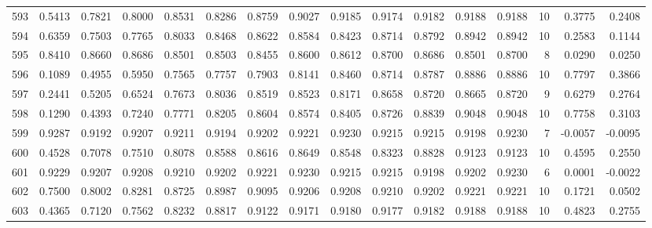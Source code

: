 \begin{tabular}{lrrrrrrrrrrrrrrr}
593 &      0.5413 &  0.7821 &  0.8000 &  0.8531 &  0.8286 &  0.8759 &  0.9027 &  0.9185 &  0.9174 &  0.9182 &   0.9188 &     0.9188 &     10 &                    0.3775 &                     0.2408 \\
594 &      0.6359 &  0.7503 &  0.7765 &  0.8033 &  0.8468 &  0.8622 &  0.8584 &  0.8423 &  0.8714 &  0.8792 &   0.8942 &     0.8942 &     10 &                    0.2583 &                     0.1144 \\
595 &      0.8410 &  0.8660 &  0.8686 &  0.8501 &  0.8503 &  0.8455 &  0.8600 &  0.8612 &  0.8700 &  0.8686 &   0.8501 &     0.8700 &      8 &                    0.0290 &                     0.0250 \\
596 &      0.1089 &  0.4955 &  0.5950 &  0.7565 &  0.7757 &  0.7903 &  0.8141 &  0.8460 &  0.8714 &  0.8787 &   0.8886 &     0.8886 &     10 &                    0.7797 &                     0.3866 \\
597 &      0.2441 &  0.5205 &  0.6524 &  0.7673 &  0.8036 &  0.8519 &  0.8523 &  0.8171 &  0.8658 &  0.8720 &   0.8665 &     0.8720 &      9 &                    0.6279 &                     0.2764 \\
598 &      0.1290 &  0.4393 &  0.7240 &  0.7771 &  0.8205 &  0.8604 &  0.8574 &  0.8405 &  0.8726 &  0.8839 &   0.9048 &     0.9048 &     10 &                    0.7758 &                     0.3103 \\
599 &      0.9287 &  0.9192 &  0.9207 &  0.9211 &  0.9194 &  0.9202 &  0.9221 &  0.9230 &  0.9215 &  0.9215 &   0.9198 &     0.9230 &      7 &                   -0.0057 &                    -0.0095 \\
600 &      0.4528 &  0.7078 &  0.7510 &  0.8078 &  0.8588 &  0.8616 &  0.8649 &  0.8548 &  0.8323 &  0.8828 &   0.9123 &     0.9123 &     10 &                    0.4595 &                     0.2550 \\
601 &      0.9229 &  0.9207 &  0.9208 &  0.9210 &  0.9202 &  0.9221 &  0.9230 &  0.9215 &  0.9215 &  0.9198 &   0.9202 &     0.9230 &      6 &                    0.0001 &                    -0.0022 \\
602 &      0.7500 &  0.8002 &  0.8281 &  0.8725 &  0.8987 &  0.9095 &  0.9206 &  0.9208 &  0.9210 &  0.9202 &   0.9221 &     0.9221 &     10 &                    0.1721 &                     0.0502 \\
603 &      0.4365 &  0.7120 &  0.7562 &  0.8232 &  0.8817 &  0.9122 &  0.9171 &  0.9180 &  0.9177 &  0.9182 &   0.9188 &     0.9188 &     10 &                    0.4823 &                     0.2755 \\

\end{tabular}
